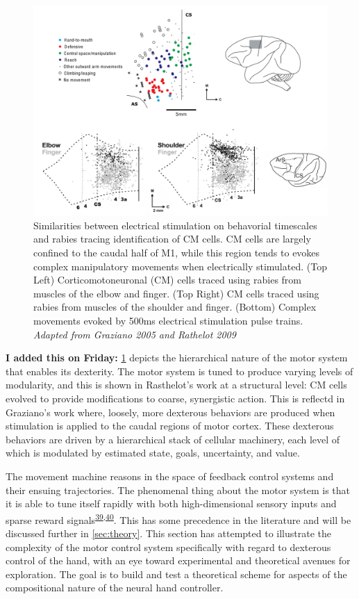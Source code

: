 \documentclass[
  a4paper,
]{article}
\begin{document}
\begin{figure}
\hypertarget{fig:strick_graziano}{%
\centering
\includegraphics[width=1\textwidth,height=\textheight]{images/physiology/strick_graziano/strick_graziano.pdf}
\caption{Similarities between electrical stimulation on behavorial
timescales and rabies tracing identification of CM cells. CM cells are
largely confined to the caudal half of M1, while this region tends to
evokes complex manipulatory movements when electrically stimulated. (Top
Left) Corticomotoneuronal (CM) cells traced using rabies from muscles of
the elbow and finger. (Top Right) CM cells traced using rabies from
muscles of the shoulder and finger. (Bottom) Complex movements evoked by
500ms electrical stimulation pulse trains. \emph{Adapted from Graziano
2005 and Rathelot 2009}}\label{fig:strick_graziano}
}
\end{figure}

\textbf{I added this on Friday:} \cref{fig:strick_graziano} depicts the
hierarchical nature of the motor system that enables its dexterity. The
motor system is tuned to produce varying levels of modularity, and this
is shown in Rasthelot's work at a structural level: CM cells evolved to
provide modifications to coarse, synergistic action. This is reflectd in
Graziano's work where, loosely, more dexterous behaviors are produced
when stimulation is applied to the caudal regions of motor cortex. These
dexterous behaviors are driven by a hierarchical stack of cellular
machinery, each level of which is modulated by estimated state, goals,
uncertainty, and value.

The movement machine reasons in the space of feedback control systems
and their ensuing trajectories. The phenomenal thing about the motor
system is that it is able to tune itself rapidly with both
high-dimensional sensory inputs and sparse reward
signals\textsuperscript{\protect\hyperlink{ref-bahlNeuralDynamicPoliciesfor2020}{39},\protect\hyperlink{ref-ijspeertDynamicalMovementPrimitives2013}{40}}.
This has some precedence in the literature and will be discussed further
in \cref{sec:theory}. This section has attempted to illustrate the
complexity of the motor control system specifically with regard to
dexterous control of the hand, with an eye toward experimental and
theoretical avenues for exploration. The goal is to build and test a
theoretical scheme for aspects of the compositional nature of the neural
hand controller.
\end{document}
